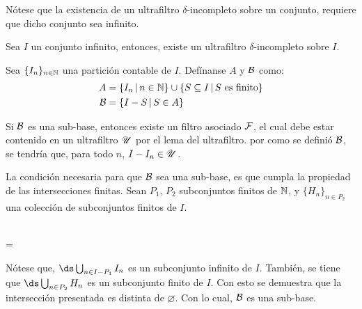 Nótese que la existencia de un ultrafiltro $\delta$-incompleto sobre
un conjunto, requiere que dicho conjunto sea infinito.

\begin{theorem}
  Sea $I$ un conjunto infinito, entonces, existe un ultrafiltro
  $\delta$-incompleto sobre $I$.
\end{theorem}

\begin{demo}
  Sea $\{I_n\}_{n\in\mathbb{N}}$ una partición contable de $I$. Defínanse $A$ y $\mathcal{B}$
  como:
  \begin{align*}
    A &= \{I_n \,|\, n\in\mathbb{N}\} \cup \{S \subseteq I \,|\, S \text{ es finito}\}\\
    \mathcal{B} &= \{I - S \,|\, S \in A\}
  \end{align*}

  Si $\mathcal{B}$ es una sub-base, entonces existe un filtro asociado $\mathcal{F}$, el cual
  debe estar contenido en un ultrafiltro $\mathscr{U}$ por el lema del ultrafiltro. por
  como se definió $\mathcal{B}$, se tendría que, para todo $n$, $I-I_n\in\mathscr{U}$.

  La condición necesaria para que $\mathcal{B}$ sea una sub-base, es que cumpla la
  propiedad de las intersecciones finitas.
  Sean $P_1$, $P_2$ subconjuntos finitos de $\mathbb{N}$, y $\{H_n\}_{n\in P_2}$ una
  colección de subconjuntos finitos de $I$.

  \begin{longderivation}
      \\
    =\\
  \end{longderivation}

  Nótese que, $\ds\bigcup_{n\in I - P_1} I_n$ es un subconjunto infinito de $I$.
  También, se tiene que $\ds\bigcup_{n\in P_2}H_n$ es un subconjunto finito de $I$.
  Con esto se demuestra que la intersección presentada es distinta de $\varnothing$.
  Con lo cual, $\mathcal{B}$ es una sub-base.
\end{demo}
